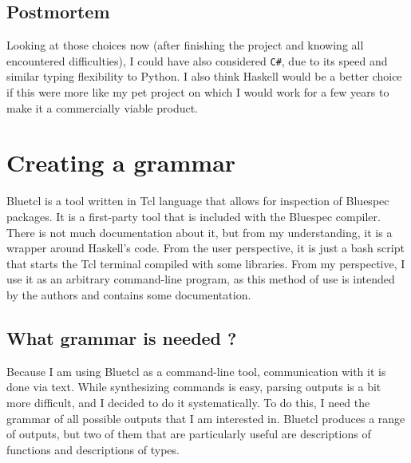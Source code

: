\documentclass[12pt]{report}
\begin{document}
\subsection{Postmortem}
Looking at those choices now (after finishing the project and knowing all encountered difficulties), I could have also considered \verb!C#!, due to its speed and similar typing flexibility to Python. I also think Haskell would be a better choice if this were more like my pet project on which I would work for a few years to make it a commercially viable product.
  
\section{Creating a grammar}  
  
\begin{tcolorbox}[title=Bluetcl]  
  Bluetcl is a tool written in Tcl language that allows for inspection of Bluespec packages. It is a first-party tool that is included with the Bluespec compiler. There is not much documentation about it, but from my understanding, it is a wrapper around Haskell's code.  
  From the user perspective, it is just a bash script that starts the Tcl terminal compiled with some libraries. From my perspective, I use it as an arbitrary command-line program, as this method of use is intended by the authors and contains some documentation.  
\end{tcolorbox} 
\subsection{What grammar is needed ?}
Because I am using Bluetcl as a command-line tool, communication with it is done via text.  
While synthesizing commands is easy, parsing outputs is a bit more difficult, and I decided to do it systematically.  
To do this, I need the grammar of all possible outputs that I am interested in.  
Bluetcl produces a range of outputs, but two of them that are particularly useful are descriptions of functions and descriptions of types.  
\end{document}
